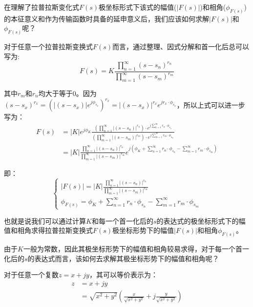 \documentclass{article}
\numberwithin{equation}{section}
\numberwithin{figure}{section}
\begin{document}
在理解了拉普拉斯变化式$F(s)$极坐标形式下该式的幅值($|F(s)|$)和相角($\phi_{F(s)}$)的本征意义和作为传输函数时具备的延申意义后，我们应该如何求解$|F(s)|$和$\phi_{F(s)}$呢？

对于任意一个拉普拉斯变换式$F(s)$而言，通过整理、因式分解和首一化后总可以写为:
\begin{equation}
    F(s)=K\frac{\prod_{n=1}^{\infty}(s-s_n)^{r_n}}{\prod_{m=1}^{\infty}(s-s_m)^{r_m}}
\end{equation}

其中$r_m$和$r_n$均大于等于0。因为$(s-s_x)^{r_x}=(|(s-s_x)|e^{j\phi_{s_x}})^{r_x}=|(s-s_x)|^{r_x}e^{jr_x·\phi_{s_x}}$，所以上式可以进一步写为：
\begin{equation}
    \begin{split}
        F(s)&=|K|e^{j\phi_K}\frac{(\prod_{n=1}^{\infty}|(s-s_n)|^{r_n})·e^{j\sum_{n=1}^{\infty}r_n·\phi_{s_n}}}{(\prod_{m=1}^{\infty}|(s-s_m)|^{r_m})·e^{j\sum_{m=1}^{\infty}r_m·\phi_{s_m}}}\\
        &=|K|\frac{\prod_{n=1}^{\infty}|(s-s_n)|^{r_n}}{\prod_{m=1}^{\infty}|(s-s_m)|^{r_m}}e^{j(\phi_K+\sum_{n=1}^{\infty}r_n·\phi_{s_n}-\sum_{m=1}^{\infty}r_m·\phi_{s_m})}
    \end{split}
\end{equation}

即：
\begin{equation}
    \begin{cases}
        |F(s)|=|K|\frac{\prod_{n=1}^{\infty}|(s-s_n)|^{r_n}}{\prod_{m=1}^{\infty}|(s-s_m)|^{r_m}}\\
        \phi_{F(s)}=\phi_K+\sum_{n=1}^{\infty}r_n·\phi_{s_n}-\sum_{m=1}^{\infty}r_m·\phi_{s_m}
    \end{cases}\label{laplacepolarcoordinate}
\end{equation}

也就是说我们可以通过计算$K$和每一个首一化后的$s$的表达式的极坐标形式下的幅值和相角求得拉普拉斯变换式$F(s)$极坐标形势下的幅值$|F(s)|$和相角$\phi_{F(s)}$。

由于$K$一般为常数，因此其极坐标形势下的幅值和相角较易求得，对于每一个首一化后的$s$的表达式而言，该如何去求解其极坐标形势下的幅值和相角呢？

对于任意一个复数$z=x+jy$，其可以等价表示为：
\begin{equation}
    \begin{split}
        z&=x+jy\\
        &=\sqrt{x^2+y^2}(\frac{x}{\sqrt{x^2+y^2}}+j\frac{y}{\sqrt{x^2+y^2}})\\
    \end{split}
\end{equation}
\end{document}
